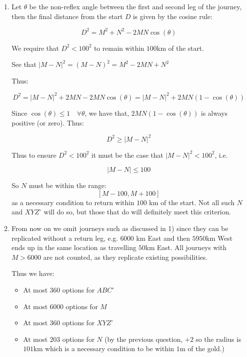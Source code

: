 \documentclass{article}
\begin{document}
\begin{enumerate}
   And thus we have only one choice of return bearing: $270^\circ$, and then our return positions all lie due East of the origin

   By symmetry this argument holds for all initial bearings $ABC^\circ$, with only $XYZ^\circ$ the exact reverse bearing possible if we want to return within $100$ km of the start location

   \item Let $\theta$ be the non-reflex angle between the first and second leg of the journey, then the final distance from the start $D$ is given by the cosine rule:

   $$
   D^2 = M^2 + N^2 - 2 M N \cos(\theta)
   $$

   We require that $D^2 < 100^2$ to remain within $100$km of the start.

    See that $|M - N|^2 = (M-N)^2 = M^2 -2MN + N^2$

    Thus:

    $$
    D^2 = |M-N|^2 + 2MN - 2MN\cos(\theta) = |M-N|^2 + 2MN(1-\cos(\theta))
    $$


   Since $\cos(\theta) \leq 1 \quad \forall \theta$, we have that, $2MN(1-\cos (\theta))$ is always positive (or zero). Thus:

   $$
   D^2 \geq |M-N|^2
   $$

   Thus to ensure $D^2 < 100^2$ it must be the case that $|M-N|^2 < 100^2$, i.e.

   $$
   |M-N| \leq 100
   $$

   So $N$ must be within the range: $$[M-100, M+100]$$ as a necessary condition to return within $100$ km of the start. Not all such $N$ and $XYZ^\circ$ will do so, but those that do will definitely meet this criterion.

   \item From now on we omit journeys such as discussed in 1) since they can be replicated without a return leg, e.g. $6000$ km East and then $5950$km West ends up in the same location as travelling $50$km East. All journeys with $M>6000$ are not counted, as they replicate existing possibilities.

   Thus we have:
   \begin{itemize}
   \item At most $360$ options for $ABC^\circ$
   \item At most $6000$ options for $M$
   \item At most $360$ options for $XYZ^\circ$
   \item At most $203$ options for $N$ (by the previous question, $+2$ so the radius is $101$km which is a necessary condition to be within $1$m of the gold.) 
   \end{itemize}


\end{enumerate}
\end{document}
